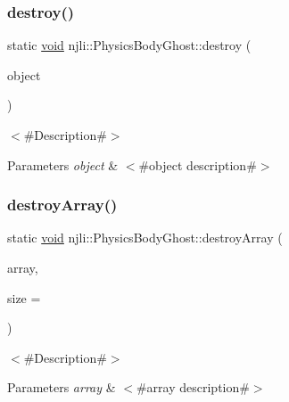 \subsubsection{\texorpdfstring{destroy()}{destroy()}}
{\footnotesize\ttfamily static \mbox{\hyperlink{_thread_8h_af1e856da2e658414cb2456cb6f7ebc66}{void}} njli\+::\+Physics\+Body\+Ghost\+::destroy (\begin{DoxyParamCaption}\item[{\mbox{\hyperlink{classnjli_1_1_physics_body_ghost}{Physics\+Body\+Ghost}} $\ast$}]{object }\end{DoxyParamCaption})\hspace{0.3cm}{\ttfamily [static]}}

$<$\#\+Description\#$>$


\begin{DoxyParams}{Parameters}
{\em object} & $<$\#object description\#$>$ \\
\hline
\end{DoxyParams}
\mbox{\label{classnjli_1_1_physics_body_ghost_aef9155fedb503e9d7d57f8f803de18ce}} 
\subsubsection{\texorpdfstring{destroy\+Array()}{destroyArray()}}
{\footnotesize\ttfamily static \mbox{\hyperlink{_thread_8h_af1e856da2e658414cb2456cb6f7ebc66}{void}} njli\+::\+Physics\+Body\+Ghost\+::destroy\+Array (\begin{DoxyParamCaption}\item[{\mbox{\hyperlink{classnjli_1_1_physics_body_ghost}{Physics\+Body\+Ghost}} $\ast$$\ast$}]{array,  }\item[{const \mbox{\hyperlink{_util_8h_a10e94b422ef0c20dcdec20d31a1f5049}{u32}}}]{size = {} }\end{DoxyParamCaption})\hspace{0.3cm}{\ttfamily [static]}}

$<$\#\+Description\#$>$


\begin{DoxyParams}{Parameters}
{\em array} & $<$\#array description\#$>$ \\
\hline
\end{DoxyParams}
\mbox{\label{classnjli_1_1_physics_body_ghost_a01a4600e0521f09ec19879c1bdea3b8c}} 
